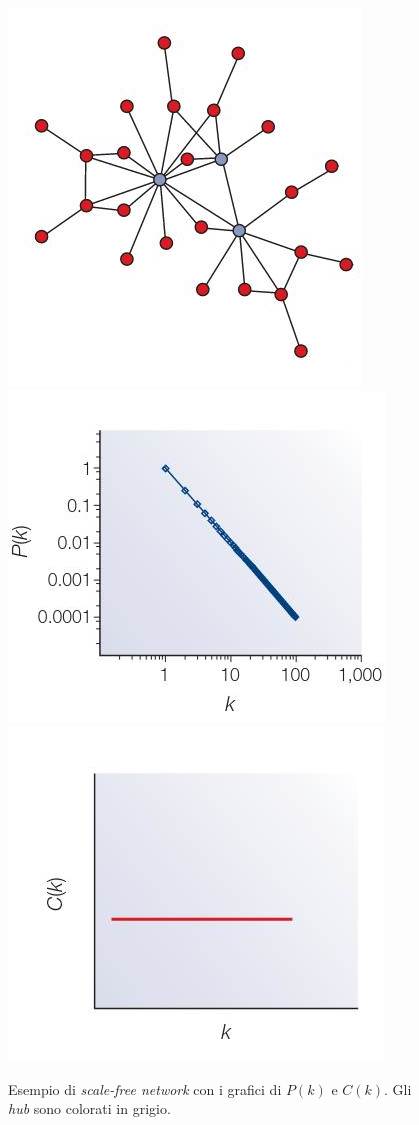 \documentclass[a4paper,12pt, oneside]{book}
\begin{document}
\begin{figure}
  \centering
  \includegraphics[scale = 2.25]{img/sfnet1.jpg}\\
  \includegraphics[scale = 1.75]{img/sfnet2.jpg}
  \includegraphics[scale = 1.75]{img/sfnet3.jpg}
  \caption{Esempio di \textit{scale-free network} con i grafici di $P(k)$ e
    $C(k)$. Gli \textit{hub} sono colorati in grigio.} 
  \label{fig:sfnet}
\end{figure}
\end{document}
